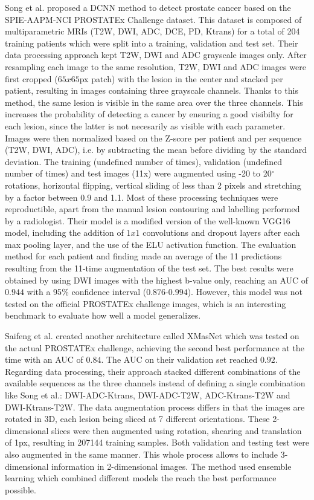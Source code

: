 Song et al. \cite{07} proposed a DCNN method to detect prostate cancer based on the SPIE-AAPM-NCI PROSTATEx Challenge dataset. This dataset is composed of multiparametric MRIs (T2W, DWI, ADC, DCE, PD, Ktrans) for a total of 204 training patients which were split into a training, validation and test set. Their data processing approach kept T2W, DWI and ADC grayscale images only. After resampling each image to the same resolution, T2W, DWI and ADC images were first cropped ($65x65$px patch) with the lesion in the center and stacked per patient, resulting in images containing three grayscale channels. Thanks to this method, the same lesion is visible in the same area over the three channels. This increases the probability of detecting a cancer by ensuring a good visibilty for each lesion, since the latter is not necesarily as visible with each parameter. Images were then normalized based on the Z-score per patient and per sequence (T2W, DWI, ADC), i.e. by subtracting the mean before dividing by the standard deviation. The training (undefined number of times), validation (undefined number of times) and test images (11x) were augmented using -20 to 20$^\circ$ rotations, horizontal flipping, vertical sliding of less than 2 pixels and stretching by a factor between 0.9 and 1.1. Most of these processing techniques were reproductible, apart from the manual lesion contouring and labelling performed by a radiologist. 
Their model is a modified version of the well-known VGG16 model, including the addition of $1x1$ convolutions and dropout layers after each max pooling layer, and the use of the ELU activation function. The evaluation method for each patient and finding made an average of the 11 predictions resulting from the 11-time augmentation of the test set. The best results were obtained by using DWI images with the highest b-value only, reaching an AUC of $0.944$ with a 95$\%$ confidence interval ($0.876$-$0.994$). However, this model was not tested on the official PROSTATEx challenge images, which is an interesting benchmark to evaluate how well a model generalizes.

Saifeng et al. \cite{31} created another architecture called XMasNet which was tested on the actual PROSTATEx challenge, achieving the second best performance at the time with an AUC of $0.84$. The AUC on their validation set reached $0.92$. Regarding data processing, their approach stacked different combinations of the available sequences as the three channels instead of defining a single combination like Song et al.: DWI-ADC-Ktrans, DWI-ADC-T2W, ADC-Ktrans-T2W and DWI-Ktrans-T2W. The data augmentation process differs in that the images are rotated in 3D, each lesion being sliced at 7 different orientations. These 2-dimensional slices were then augmented using rotation, shearing and translation of 1px, resulting in 207144 training samples. Both validation and testing test were also augmented in the same manner. This whole process allows to include 3-dimensional information in 2-dimensional images. The method used ensemble learning which combined different models the reach the best performance possible. 

